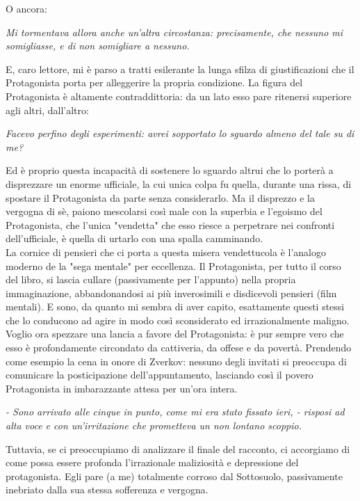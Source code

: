 \documentclass[12pt,a4paper]{report}
\theoremstyle{definition}
\theoremstyle{Theorem}
\theoremstyle{definition}
\theoremstyle{definition}
\theoremstyle{definition}
\begin{document}
 O ancora: 
 \begin{center}
 	\textit{Mi tormentava allora anche un'altra circostanza: precisamente, che nessuno mi somigliasse, e di non somigliare a nessuno.}
 \end{center}
E, caro lettore, mi è parso a tratti esilerante la lunga sfilza di giustificazioni che il Protagonista porta per alleggerire la propria condizione. La figura del Protagonista è altamente contraddittoria: da un lato esso pare ritenersi superiore agli altri, dall'altro:
\begin{center}
	\textit{Facevo perfino degli esperimenti: avrei sopportato lo sguardo almeno del tale su di me?}
\end{center}
Ed è proprio questa incapacità di sostenere lo sguardo altrui che lo porterà a disprezzare un enorme ufficiale, la cui unica colpa fu quella, durante una rissa, di spostare il Protagonista da parte senza considerarlo. Ma il disprezzo e la vergogna di sè, paiono mescolarsi così male con la superbia e l'egoismo del Protagonista, che l'unica "vendetta" che esso riesce a perpetrare nei confronti dell'ufficiale, è quella di urtarlo con una spalla camminando.\\
La cornice di pensieri che ci porta a questa misera vendettucola è l'analogo moderno de la "sega mentale" per eccellenza. Il Protagonista, per tutto il corso del libro, si lascia cullare (passivamente per l'appunto) nella propria immaginazione, abbandonandosi ai più inverosimili e disdicevoli pensieri (film mentali). E sono, da quanto mi sembra di aver capito, esattamente questi stessi che lo conducono ad agire in modo così sconsiderato ed irrazionalmente maligno.\\
Voglio ora spezzare una lancia a favore del Protagonista: è pur sempre vero che esso è profondamente circondato da cattiveria, da offese e da povertà. Prendendo come esempio la cena in onore di Zverkov: nessuno degli invitati si preoccupa di comunicare la posticipazione dell'appuntamento, lasciando così il povero Protagonista in imbarazzante attesa per un'ora intera.
\begin{center}
	\textit{- Sono arrivato alle cinque in punto, come mi era stato fissato ieri, - risposi ad alta voce e con un'irritazione che prometteva un non lontano scoppio.}
\end{center}
Tuttavia, se ci preoccupiamo di analizzare il finale del racconto, ci accorgiamo di come possa essere profonda l'irrazionale maliziosità e depressione del protagonista. Egli pare (a me) totalmente corroso dal Sottosuolo, passivamente inebriato dalla sua stessa sofferenza e vergogna.\\
\end{document}
